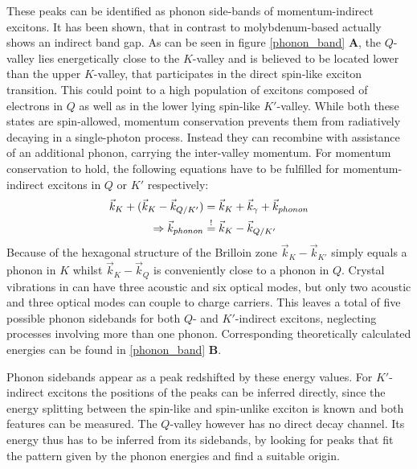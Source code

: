 These peaks can be identified as phonon side-bands of momentum-indirect excitons\cite{lindlau_identifying_2017}. It has been shown, that in contrast to molybdenum-based \tmds \wse actually shows an indirect band gap\cite{zhang_probing_2015, hsu_evidence_2017}. As can be seen in figure \ref{phonon_band} \textbf{A}, the $Q$-valley lies energetically close to the $K$-valley and is believed to be located lower than the upper $K$-valley, that participates in the direct spin-like exciton transition. This could point to a high population of excitons composed of electrons in $Q$ as well as in the lower lying spin-like $K'$-valley. While both these states are spin-allowed, momentum conservation prevents them from radiatively decaying in a single-photon process. Instead they can recombine with assistance of an additional phonon, carrying the inter-valley momentum. For momentum conservation to hold, the following equations have to be fulfilled for momentum-indirect excitons in $Q$ or $K'$ respectively:
\begin{align}
	\vec{k}_K + (\vec{k}_K - \vec{k}_{Q/K'}) &= \vec{k}_K + \vec{k}_\gamma + \vec{k}_{phonon}\\
	\Rightarrow \vec{k}_{phonon} &\overset{!}{=} \vec{k}_K - \vec{k}_{Q/K'}
\end{align}
Because of the hexagonal structure of the Brilloin zone $\vec{k}_K - \vec{k}_{K'}$ simply equals a phonon in $K$ whilst $\vec{k}_K - \vec{k}_{Q}$ is conveniently close to a phonon in $Q$. Crystal vibrations in \tmds can have three acoustic and six optical modes, but only two acoustic and three optical modes can couple to charge carriers. This leaves a total of five possible phonon sidebands for both $Q$- and $K'$-indirect excitons, neglecting processes involving more than one phonon. Corresponding theoretically calculated energies can be found in \ref{phonon_band} \textbf{B}\cite{jin_intrinsic_2014}. 

Phonon sidebands appear as a peak redshifted by these energy values. For $K'$-indirect excitons the positions of the peaks can be inferred directly, since the energy splitting between the spin-like and spin-unlike exciton is known and both features can be measured. The $Q$-valley however has no direct decay channel. Its energy thus has to be inferred from its sidebands, by looking for peaks that fit the pattern given by the phonon energies and find a suitable origin.

\begin{figure}[t]
\centering

\end{figure}
\cite{van_der_donck_excitons_2018} 

